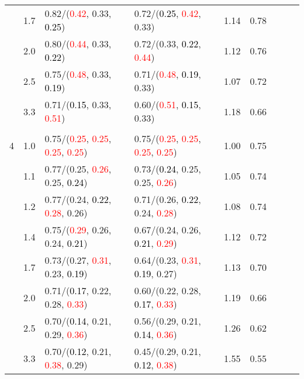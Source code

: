 \documentclass[10pt,a4paper]{report}
\begin{document}
\begin{table}[!htbp]
\begin{center}
{\begin{tabular}{ccllccccc}
			&1.7&0.82/(\textcolor{red}{0.42}, 0.33, \textcolor{black}{0.25})&0.72/(\textcolor{black}{0.25}, \textcolor{red}{0.42}, 0.33)&1.14&0.78\\
			&2.0&0.80/(\textcolor{red}{0.44}, 0.33, \textcolor{black}{0.22})&0.72/(0.33, \textcolor{black}{0.22}, \textcolor{red}{0.44})&1.12&0.76\\
			&2.5&0.75/(\textcolor{red}{0.48}, 0.33, \textcolor{black}{0.19})&0.71/(\textcolor{red}{0.48}, \textcolor{black}{0.19}, 0.33)&1.07&0.72\\
			&3.3&0.71/(\textcolor{black}{0.15}, 0.33, \textcolor{red}{0.51})&0.60/(\textcolor{red}{0.51}, \textcolor{black}{0.15}, 0.33)&1.18&0.66\\
			&&&&\\
			4			&1.0&0.75/(\textcolor{red}{0.25}, \textcolor{red}{0.25}, \textcolor{red}{0.25}, \textcolor{red}{0.25})&0.75/(\textcolor{red}{0.25}, \textcolor{red}{0.25}, \textcolor{red}{0.25}, \textcolor{red}{0.25})&1.00&0.75\\
			&1.1&0.77/(0.25, \textcolor{red}{0.26}, 0.25, \textcolor{black}{0.24})&0.73/(\textcolor{black}{0.24}, 0.25, 0.25, \textcolor{red}{0.26})&1.05&0.74\\
			&1.2&0.77/(0.24, \textcolor{black}{0.22}, \textcolor{red}{0.28}, 0.26)&0.71/(0.26, \textcolor{black}{0.22}, 0.24, \textcolor{red}{0.28})&1.08&0.74\\
			&1.4&0.75/(\textcolor{red}{0.29}, 0.26, 0.24, \textcolor{black}{0.21})&0.67/(0.24, 0.26, \textcolor{black}{0.21}, \textcolor{red}{0.29})&1.12&0.72\\
			&1.7&0.73/(0.27, \textcolor{red}{0.31}, 0.23, \textcolor{black}{0.19})&0.64/(0.23, \textcolor{red}{0.31}, \textcolor{black}{0.19}, 0.27)&1.13&0.70\\
			&2.0&0.71/(\textcolor{black}{0.17}, 0.22, 0.28, \textcolor{red}{0.33})&0.60/(0.22, 0.28, \textcolor{black}{0.17}, \textcolor{red}{0.33})&1.19&0.66\\
			&2.5&0.70/(\textcolor{black}{0.14}, 0.21, 0.29, \textcolor{red}{0.36})&0.56/(0.29, 0.21, \textcolor{black}{0.14}, \textcolor{red}{0.36})&1.26&0.62\\
			&3.3&0.70/(\textcolor{black}{0.12}, 0.21, \textcolor{red}{0.38}, 0.29)&0.45/(0.29, 0.21, \textcolor{black}{0.12}, \textcolor{red}{0.38})&1.55&0.55\\
			\bottomrule
		\end{tabular}}
	\end{center}
\end{table}
\end{document}
